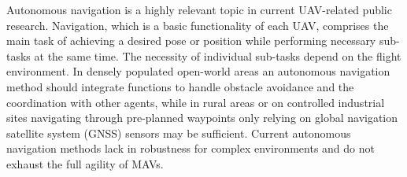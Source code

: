 Autonomous navigation is a highly relevant topic in current UAV-related public research.
Navigation, which is a basic functionality of each UAV,
comprises the main task of achieving a desired pose or position
while performing necessary sub-tasks at the same time. \cite{loquercio2018learning}
The necessity of individual sub-tasks depend on the flight environment.
In densely populated open-world areas an autonomous navigation method should integrate
functions to handle
obstacle avoidance and the coordination with other agents,
while in rural areas or on controlled industrial sites 
navigating through pre-planned waypoints only relying on global navigation satellite system (GNSS) sensors may be sufficient.
Current autonomous navigation methods lack in robustness for complex environments and do not exhaust the full agility of MAVs.








